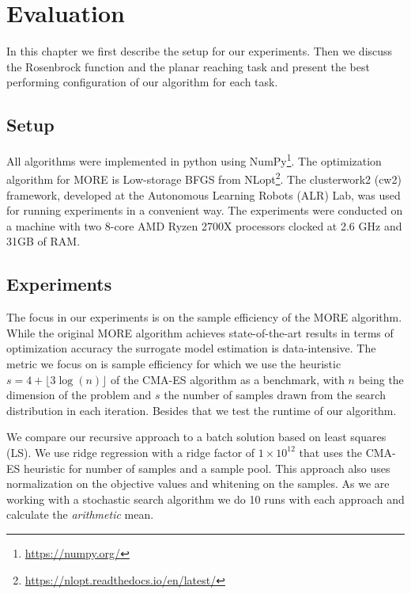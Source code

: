 
\chapter{Evaluation}
In this chapter we first describe the setup for our experiments.
Then we discuss the Rosenbrock function and the planar
reaching task and present the best performing
configuration of our algorithm for each task.


\section{Setup}
All algorithms were implemented in python using
NumPy\footnote{\href{https://numpy.org/}{https://numpy.org/}}.
The optimization algorithm for MORE is Low-storage BFGS
from NLopt\footnote{\href{https://nlopt.readthedocs.io/en/latest/}
{https://nlopt.readthedocs.io/en/latest/}}.
The clusterwork2 (cw2) framework, developed at the
Autonomous Learning Robots (ALR) Lab, was used for
running experiments in a convenient way.
The experiments were conducted on a machine with two 8-core
AMD Ryzen 2700X processors clocked at 2.6 GHz and 31GB of RAM.


\section{Experiments}
The focus in our experiments is on the sample efficiency of the
MORE algorithm. While the original MORE algorithm achieves
state-of-the-art results in terms of optimization accuracy
the surrogate model estimation is data-intensive.
The metric we focus on is sample efficiency for which we use the heuristic
$s = 4 + \lfloor 3 \log(n) \rfloor$ of the CMA-ES
algorithm \citep{hansen2016cma} as a benchmark, with $n$ being the dimension
of the problem and $s$ the number of samples drawn from the
search distribution in each iteration. Besides that
we test the runtime of our algorithm.

We compare our recursive approach to a batch solution
based on least squares (LS).
We use ridge regression with a ridge factor of
$1 \times 10^{12}$ that uses the
CMA-ES heuristic for number of samples and a sample pool.
This approach also uses normalization
on the objective values and whitening on the samples.
As we are working with a stochastic search algorithm we do
10 runs with each approach and calculate the \textit{arithmetic} mean.

